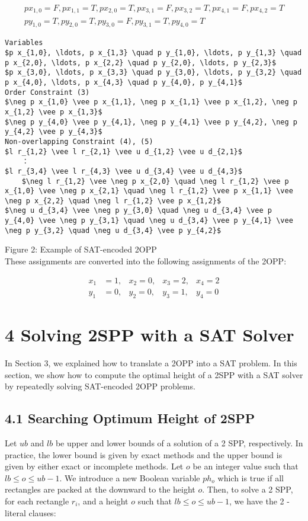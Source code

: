 \documentclass[10pt]{article}
\begin{document}
$$
\begin{gathered}
p x_{1,0}=F, p x_{1,1}=T, p x_{2,0}=T, p x_{3,1}=F, p x_{3,2}=T, p x_{4,1}=F, p x_{4,2}=T \\
p y_{1,0}=T, p y_{2,0}=T, p y_{3,0}=F, p y_{3,1}=T, p y_{4,0}=T
\end{gathered}
$$

\begin{verbatim}
Variables
$p x_{1,0}, \ldots, p x_{1,3} \quad p y_{1,0}, \ldots, p y_{1,3} \quad p x_{2,0}, \ldots, p x_{2,2} \quad p y_{2,0}, \ldots, p y_{2,3}$
$p x_{3,0}, \ldots, p x_{3,3} \quad p y_{3,0}, \ldots, p y_{3,2} \quad p x_{4,0}, \ldots, p x_{4,3} \quad p y_{4,0}, p y_{4,1}$
Order Constraint (3)
$\neg p x_{1,0} \vee p x_{1,1}, \neg p x_{1,1} \vee p x_{1,2}, \neg p x_{1,2} \vee p x_{1,3}$
$\neg p y_{4,0} \vee p y_{4,1}, \neg p y_{4,1} \vee p y_{4,2}, \neg p y_{4,2} \vee p y_{4,3}$
Non-overlapping Constraint (4), (5)
$l r_{1,2} \vee l r_{2,1} \vee u d_{1,2} \vee u d_{2,1}$
    ：
$l r_{3,4} \vee l r_{4,3} \vee u d_{3,4} \vee u d_{4,3}$
    $\neg l r_{1,2} \vee \neg p x_{2,0} \quad \neg l r_{1,2} \vee p x_{1,0} \vee \neg p x_{2,1} \quad \neg l r_{1,2} \vee p x_{1,1} \vee \neg p x_{2,2} \quad \neg l r_{1,2} \vee p x_{1,2}$
$\neg u d_{3,4} \vee \neg p y_{3,0} \quad \neg u d_{3,4} \vee p y_{4,0} \vee \neg p y_{3,1} \quad \neg u d_{3,4} \vee p y_{4,1} \vee \neg p y_{3,2} \quad \neg u d_{3,4} \vee p y_{4,2}$
\end{verbatim}

Figure 2: Example of SAT-encoded 2OPP\\
These assignments are converted into the following assignments of the 2OPP:

$$
\begin{array}{rrrrr}
x_{1} & =1, & x_{2}=0, & x_{3}=2, & x_{4}=2 \\
y_{1} & =0, & y_{2}=0, & y_{3}=1, & y_{4}=0
\end{array}
$$

\section*{4 Solving 2SPP with a SAT Solver}
In Section 3, we explained how to translate a 2OPP into a SAT problem. In this section, we show how to compute the optimal height of a 2SPP with a SAT solver by repeatedly solving SAT-encoded 2OPP problems.

\subsection*{4.1 Searching Optimum Height of 2SPP}
Let $u b$ and $l b$ be upper and lower bounds of a solution of a 2 SPP, respectively. In practice, the lower bound is given by exact methods and the upper bound is given by either exact or incomplete methods. Let $o$ be an integer value such that $l b \leq o \leq u b-1$. We introduce a new Boolean variable $p h_{o}$ which is true if all rectangles are packed at the downward to the height $o$. Then, to solve a 2 SPP, for each rectangle $r_{i}$, and a height $o$ such that $l b \leq o \leq u b-1$, we have the 2 -literal clauses:
\end{document}
